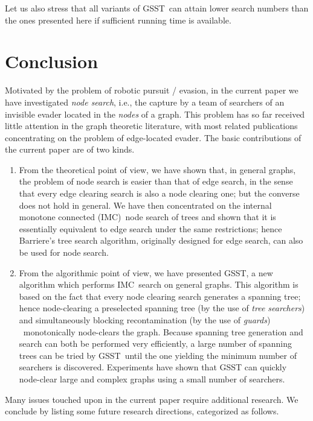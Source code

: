 \documentclass[11pt]{article}\usepackage{amsmath}
\begin{document}
Let us also stress that all variants of GSST\ can attain lower search numbers
than the ones presented here if sufficient running time is available.

\section{Conclusion}

\label{sec07}

Motivated by the problem of robotic pursuit / evasion, in the current paper we
have investigated \emph{node search}, i.e., the capture by a team of searchers
of an invisible evader located in the \emph{nodes} of a graph. This problem
has so far received little attention in the graph theoretic literature, with
most related publications concentrating on the problem of edge-located evader.
The basic contributions of the current paper are of two kinds.

\begin{enumerate}
\item From the theoretical point of view, we have shown that, in general
graphs, the problem of node search is easier than that of edge search, in the
sense that every edge clearing search is also a node clearing one; but the
converse does not hold in general. We have then concentrated on the internal
monotone connected (IMC)\ node search of trees and shown that it is
essentially equivalent to edge search under the same restrictions; hence
Barriere's tree search algorithm, originally designed for edge search, can
also be used for node search.

\item From the algorithmic point of view, we have presented GSST, a new
algorithm which performs IMC\ search on general graphs. This algorithm is
based on the fact that every node clearing search generates a spanning tree;
hence node-clearing a preselected spanning tree (by the use of \emph{tree
searchers}) and simultaneously blocking recontamination (by the use of
\emph{guards}) \ monotonically node-clears the graph. Because spanning tree
generation and search can both be performed very efficiently, a large number
of spanning trees can be tried by GSST\ until the one yielding the minimum
number of searchers is discovered. Experiments have shown that GSST can
quickly node-clear large and complex graphs using a small number of searchers.
\end{enumerate}

Many issues touched upon in the current paper require additional research. We
conclude by listing some future research directions, categorized as follows.
\end{document}
